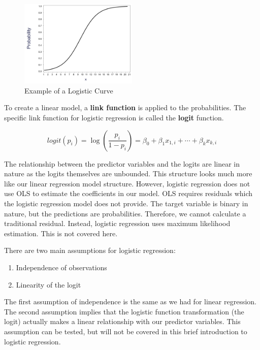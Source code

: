 \documentclass[
  letterpaper,
  DIV=11,
  numbers=noendperiod]{scrreprt}
\providecommand{\tightlist}{%
  \setlength{\itemsep}{0pt}\setlength{\parskip}{0pt}}\usepackage{longtable,booktabs,array}
\begin{document}
\begin{figure}

{\centering \includegraphics[width=0.5\textwidth,height=\textheight]{./img/logistic.png}

}

\caption{\label{fig-logistic}Example of a Logistic Curve}

\end{figure}

To create a linear model, a \textbf{link function} is applied to the
probabilities. The specific link function for logistic regression is
called the \textbf{logit} function.

\[
logit(p_i) = \log(\frac{p_i}{1-p_i}) = \beta_0 + \beta_1x_{1,i} + \cdots + \beta_k x_{k,i}
\]

The relationship between the predictor variables and the logits are
linear in nature as the logits themselves are unbounded. This structure
looks much more like our linear regression model structure. However,
logistic regression does not use OLS to estimate the coefficients in our
model. OLS requires residuals which the logistic regression model does
not provide. The target variable is binary in nature, but the
predictions are probabilities. Therefore, we cannot calculate a
traditional residual. Instead, logistic regression uses maximum
likelihood estimation. This is not covered here.

There are two main assumptions for logistic regression:

\begin{enumerate}
\def\labelenumi{\arabic{enumi}.}
\tightlist
\item
  Independence of observations
\item
  Linearity of the logit
\end{enumerate}

The first assumption of independence is the same as we had for linear
regression. The second assumption implies that the logistic function
transformation (the logit) actually makes a linear relationship with our
predictor variables. This assumption can be tested, but will not be
covered in this brief introduction to logistic regression.
\end{document}
